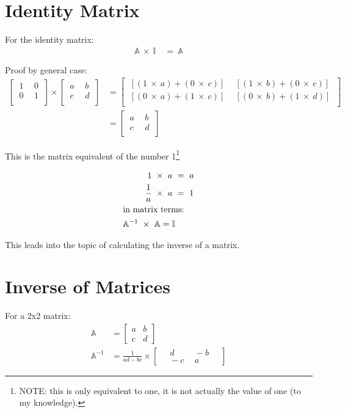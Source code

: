 \section{Identity Matrix}
\label{sec:IdentityMatrix}
For the identity matrix:
\begin{align}
  \mathbb{A}~\times~\mathbb{I}~&=~\mathbb{A} \nonumber
\end{align}

Proof by general case:
\begin{align}
  \begin{bmatrix}
    ~1~&~0~\\
    ~0~&~1~\\
  \end{bmatrix}
  \times
  \begin{bmatrix}
    ~a~&~b~\\
    ~c~&~d~\\
  \end{bmatrix}
  &=
  \begin{bmatrix}
    ~[(1~\times~a)+(0~\times~c)]~&~[(1~\times~b)+(0~\times~c)]~\\
    ~[(0~\times~a)+(1~\times~c)]~&~[(0~\times~b)+(1~\times~d)]~\\
  \end{bmatrix}\\
  &=
  \begin{bmatrix}
    ~a~&~b~\\
    ~c~&~d~\\
  \end{bmatrix}
\end{align}

This is the matrix equivalent of the number 1\footnote{NOTE: this is only
equivalent to one, it is not actually the value of one (to my knowledge).}

\begin{align}
  1~\times~a~&=~a \\
  \frac{1}{a}~\times~a~&=~1 \\
  \intertext{in matrix terms:}
  \mathbb{A}^{-1}~\times~\mathbb{A} = \mathbb{I}
\end{align}

This leads into the topic of calculating the inverse of a matrix.

\section{Inverse of Matrices}
\label{sec:InverseOfMatrices}
For a 2x2 matrix:
\begin{align}
  \mathbb{A} & = 
    \begin{bmatrix}
      a & b \\
      c & d
    \end{bmatrix}
    \\
  \mathbb{A}^{-1} & =
    \frac{1}{ad-bc} \times
    \begin{bmatrix}
      &~d~&~-b~& \\
      &~-c~&~a~&
    \end{bmatrix}  
\end{align}

